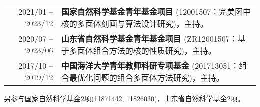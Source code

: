%
%



 \begin{tabular}{rl}	
	2021/01 -- 2023/12  & \textbf{国家自然科学基金青年基金项目} (12001507：完美图中核的多面体刻画与算法设计研究)，主持。\\
	2020/07 -- 2023/06  & \textbf{山东省自然科学基金青年基金项目} (ZR12001507：基于多面体组合方法的核的性质研究)，主持。\\
	2017/10 -- 2019/12 	&  \textbf{中国海洋大学青年教师科研专项基金} (201713051：组合最优化问题的组合多面体方法研究)，主持。
\end{tabular}

另参与国家自然科学基金2项(11871442, 11826030)，山东省自然科学基金2项。